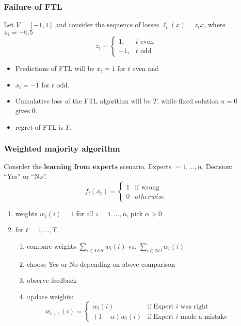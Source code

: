 \documentclass{beamer}
\begin{document}
\begin{frame}
  \frametitle{Failure of FTL}
    Let $V = [-1,1]$ and consider the sequence of losses $\ell_t(x) = z_t x$, where $z_1 = -0.5$
    \begin{equation}
      z_t = \begin{cases}
       1, & \text{$t$ even} \\
       -1, & \text{$t$ odd}
      \end{cases}
    \end{equation}

    \begin{itemize}
      \item Predictions of FTL will be $x_t = 1$ for $t$ even and
      \item $x_t = -1$ for $t$ odd.
      \item Cumulative loss of the FTL algorithm will be $T$,
            while fixed solution $u = 0$ gives $0$.
      \item regret of FTL is $T$.
    \end{itemize}
\end{frame}


\begin{frame}
  \frametitle{Weighted majority algorithm}
  Consider the \textbf{learning from experts} scenario.
  Experts $= 1, \dots, n$. Decision: ``Yes'' or ``No''.
  \begin{equation}
    f_t(x_t) = \begin{cases}
      1 & \text{if wrong}\\
      0 & otherwise
    \end{cases}
  \end{equation}

  \begin{enumerate}
    \item weights $w_1(i) = 1$ for all $i = 1, \dots, n$, pick $\alpha>0$
    \item for $t=1, \dots, T$
      \begin{enumerate}
      \item compare weights $\sum_{i\in YES} w_t(i)$ vs. $\sum_{i\in NO} w_t(i)$
      \item choose Yes or No depending on above comparison
      \item observe feedback
      \item update weights:
        \begin{equation}
          w_{t+1}(i) = \begin{cases}
              w_t(i) & \text{if Expert $i$ was right} \\
              (1-\alpha)w_t(i) & \text{if Expert $i$ made a mistake}
          \end{cases}
        \end{equation}

      \end{enumerate}
  \end{enumerate}
\end{frame}
\end{document}
